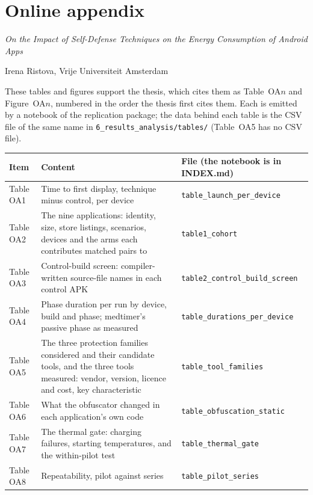 \documentclass[10pt,a4paper]{article}
\begin{document}
\section*{Online appendix}
\noindent\emph{On the Impact of Self-Defense Techniques on the Energy Consumption of Android Apps}\par\noindent Irena Ristova, Vrije Universiteit Amsterdam\par\medskip
\noindent These tables and figures support the thesis, which cites them as Table~OA$n$ and Figure~OA$n$, numbered in the order the thesis first cites them. Each is emitted by a notebook of the replication package; the data behind each table is the CSV file of the same name in \texttt{6\_results\_analysis/tables/} (Table~OA5 has no CSV file).\par\medskip
\begin{center}\small\begin{tabular}{lp{10cm}l}\toprule \textbf{Item} & \textbf{Content} & \textbf{File (the notebook is in INDEX.md)} \\ \midrule
Table OA1 & Time to first display, technique minus control, per device & \texttt{\footnotesize table\_launch\_per\_device} \\
Table OA2 & The nine applications: identity, size, store listings, scenarios, devices and the arms each contributes matched pairs to & \texttt{\footnotesize table1\_cohort} \\
Table OA3 & Control-build screen: compiler-written source-file names in each control APK & \texttt{\footnotesize table2\_control\_build\_screen} \\
Table OA4 & Phase duration per run by device, build and phase; medtimer's passive phase as measured & \texttt{\footnotesize table\_durations\_per\_device} \\
Table OA5 & The three protection families considered and their candidate tools, and the three tools measured: vendor, version, licence and cost, key characteristic & \texttt{\footnotesize table\_tool\_families} \\
Table OA6 & What the obfuscator changed in each application's own code & \texttt{\footnotesize table\_obfuscation\_static} \\
Table OA7 & The thermal gate: charging failures, starting temperatures, and the within-pilot test & \texttt{\footnotesize table\_thermal\_gate} \\
Table OA8 & Repeatability, pilot against series & \texttt{\footnotesize table\_pilot\_series} \\

\end{tabular}
\end{center}
\end{document}
